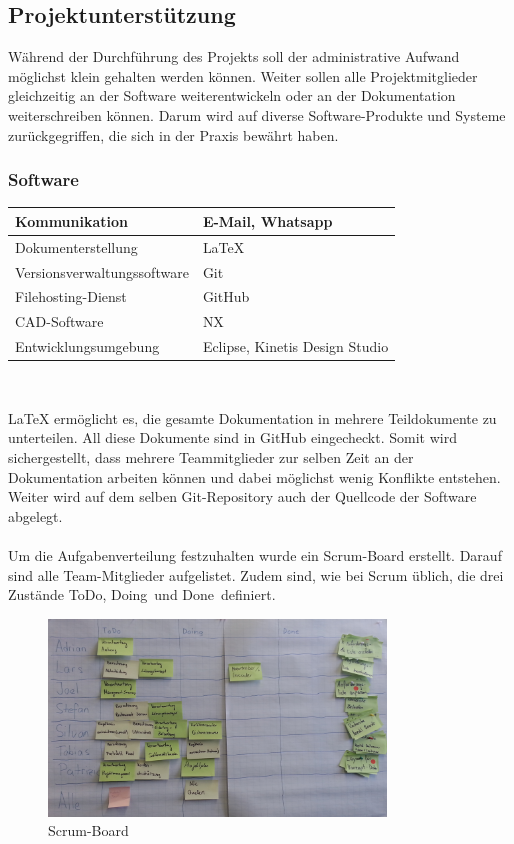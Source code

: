 \subsection{Projektunterstützung}
Während der Durchführung des Projekts soll der administrative Aufwand möglichst klein gehalten werden können. Weiter sollen alle Projektmitglieder gleichzeitig an der Software weiterentwickeln oder an der Dokumentation weiterschreiben können. Darum wird auf diverse Software-Produkte und Systeme zurückgegriffen, die sich in der Praxis bewährt haben.

\subsubsection{Software}
\begin{table}[H]
\begin{tabular}{|p{}|p{}|}\hline
	
Kommunikation	&	E-Mail, Whatsapp \\\hline
Dokumenterstellung & LaTeX\\\hline
Versionsverwaltungssoftware & Git \\\hline
Filehosting-Dienst & GitHub \\\hline
CAD-Software & NX\\\hline
Entwicklungsumgebung	& Eclipse, Kinetis Design Studio \\\hline

\end{tabular}\\
\end{table}
LaTeX ermöglicht es, die gesamte Dokumentation in mehrere Teildokumente zu unterteilen. All diese Dokumente sind in GitHub eingecheckt. Somit wird sichergestellt, dass mehrere Teammitglieder zur selben Zeit an der Dokumentation arbeiten können und dabei möglichst wenig Konflikte entstehen. Weiter wird auf dem selben Git-Repository auch der Quellcode der Software abgelegt. \\
\\
Um die Aufgabenverteilung festzuhalten wurde ein Scrum-Board erstellt. Darauf sind alle Team-Mitglieder aufgelistet. Zudem sind, wie bei Scrum üblich, die drei Zustände \glqq ToDo\grqq, \glqq Doing\grqq \ und \glqq Done\grqq \ definiert.
\begin{figure}[H]%
\centering
\includegraphics[width=0.8\textwidth]{04_Projektmanagement/fig/scrumBoard.jpg}
\caption{Scrum-Board}
\label{fig:scrumBoard}
\end{figure}